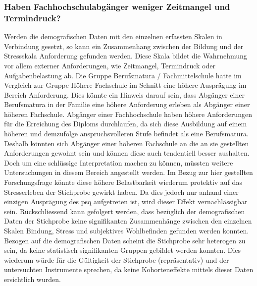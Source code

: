 \subsubsection{Haben Fachhochschulabgänger weniger Zeitmangel und Termindruck?}
Werden die demografischen Daten mit den einzelnen erfassten Skalen in Verbindung gesetzt, so kann ein Zusammenhang zwischen der Bildung und der Stressskala Anforderung gefunden werden. Diese Skala bildet die Wahrnehmung vor allem externer Anforderungen, wie Zeitmangel, Termindruck oder Aufgabenbelastung ab. Die Gruppe Berufsmatura / Fachmittelschule hatte im Vergleich zur Gruppe Höhere Fachschule im Schnitt eine höhere Ausprägung im Bereich Anforderung. Dies könnte ein Hinweis darauf sein, dass Abgänger einer Berufsmatura in der Familie eine höhere Anforderung erleben als Abgänger einer höheren Fachschule. Abgänger einer Fachhochschule haben höhere Anforderungen für die Erreichung des Diploms durchlaufen, da sich diese  Ausbildung auf einem höheren und demzufolge anspruchsvolleren Stufe befindet als eine Berufsmatura. Deshalb könnten sich Abgänger einer höheren Fachschule an die an sie gestellten Anforderungen gewohnt sein und können diese auch tendentiell besser aushalten. Doch um eine schlüssige Interpretation machen zu können, müssten weitere Untersuchungen in diesem Bereich angestellt werden. Im Bezug zur hier gestellten Forschungsfrage  könnte diese höhere Belastbarkeit wiederum protektiv auf das Stresserleben der Stichprobe gewirkt haben. Da dies jedoch nur anhand einer einzigen Ausprägung des \acrshort{psq} aufgetreten ist, wird dieser Effekt vernachlässigbar sein. Rückschliessend kann gefolgert werden, dass bezüglich der demografischen Daten der Stichprobe keine signifikanten Zusammenhänge zwischen den einzelnen Skalen Bindung, Stress und subjektives Wohlbefinden gefunden werden konnten. Bezogen auf die demografischen Daten scheint die Stichprobe sehr heterogen zu sein, da keine statistisch signifikanten Gruppen gebildet werden konnten. Dies wiederum würde für die Gültigkeit der Stichprobe (repräsentativ) und der untersuchten Instrumente sprechen, da keine Kohorteneffekte mittels dieser Daten ersichtlich wurden.

